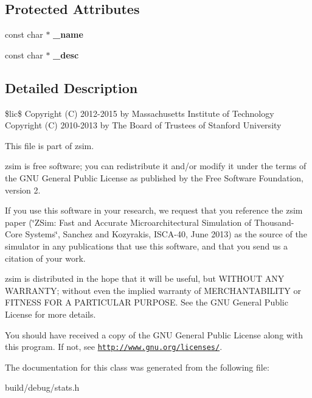 \subsection*{Protected Attributes}
\begin{DoxyCompactItemize}
\item 
\hypertarget{classStat_ab34b077d2feab4a2246188f4acb0da53}{const char $\ast$ {\bfseries \-\_\-name}}\label{classStat_ab34b077d2feab4a2246188f4acb0da53}

\item 
\hypertarget{classStat_ad02e5eab45df197dad3c18c5fc36c6d4}{const char $\ast$ {\bfseries \-\_\-desc}}\label{classStat_ad02e5eab45df197dad3c18c5fc36c6d4}

\end{DoxyCompactItemize}


\subsection{Detailed Description}
\$lic\$ Copyright (C) 2012-\/2015 by Massachusetts Institute of Technology Copyright (C) 2010-\/2013 by The Board of Trustees of Stanford University

This file is part of zsim.

zsim is free software; you can redistribute it and/or modify it under the terms of the G\-N\-U General Public License as published by the Free Software Foundation, version 2.

If you use this software in your research, we request that you reference the zsim paper (\char`\"{}\-Z\-Sim\-: Fast and Accurate Microarchitectural Simulation of
\-Thousand-\/\-Core Systems\char`\"{}, Sanchez and Kozyrakis, I\-S\-C\-A-\/40, June 2013) as the source of the simulator in any publications that use this software, and that you send us a citation of your work.

zsim is distributed in the hope that it will be useful, but W\-I\-T\-H\-O\-U\-T A\-N\-Y W\-A\-R\-R\-A\-N\-T\-Y; without even the implied warranty of M\-E\-R\-C\-H\-A\-N\-T\-A\-B\-I\-L\-I\-T\-Y or F\-I\-T\-N\-E\-S\-S F\-O\-R A P\-A\-R\-T\-I\-C\-U\-L\-A\-R P\-U\-R\-P\-O\-S\-E. See the G\-N\-U General Public License for more details.

You should have received a copy of the G\-N\-U General Public License along with this program. If not, see \href{http://www.gnu.org/licenses/}{\tt http\-://www.\-gnu.\-org/licenses/}. 

The documentation for this class was generated from the following file\-:\begin{DoxyCompactItemize}
\item 
build/debug/stats.\-h\end{DoxyCompactItemize}
